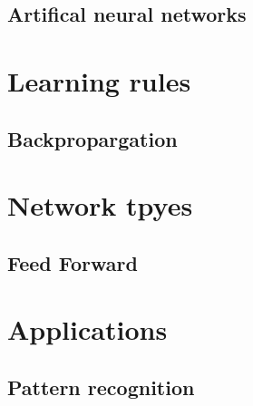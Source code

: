 \documentclass[10pt,a4paper,DIV=11]{scrreprt}
\begin{document}
\subsection{Artifical neural networks}
\section{Learning rules}
\subsection{Backpropargation}
\section{Network tpyes}
\subsection{Feed Forward}
\section{Applications}
\subsection{Pattern recognition}


\newpage


\listoffigures
\listoftables
\listofalgorithms
\lstlistoflistings

\newpage




\end{document}
